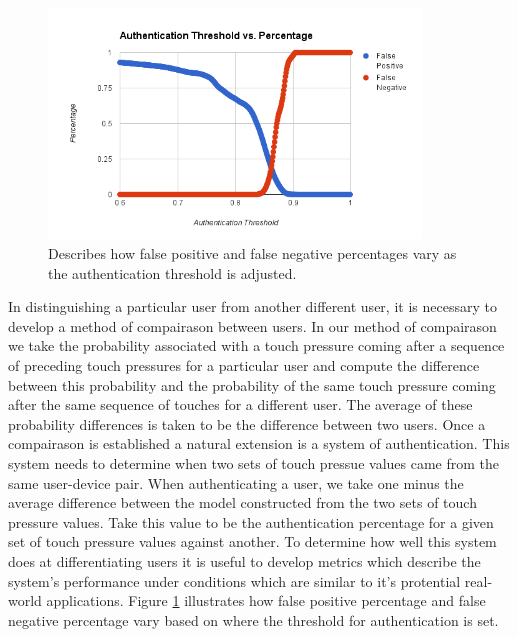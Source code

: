 \documentclass{acm_proc_article-sp}
\begin{document}
\begin{figure}
\centering
\includegraphics[width=3.9in]{threshold_vs_percentages.png}
\caption{Describes how false positive and false negative percentages vary as the authentication threshold is adjusted.}
\label{fig:threshold_vs_percentages}
\end{figure}

In distinguishing a particular user from another different user, it is necessary to develop a method of compairason between users. In our method of compairason we take the probability associated with a touch pressure coming after a sequence of preceding touch pressures for a particular user and compute the difference between this probability and the probability of the same touch pressure coming after the same sequence of touches for a different user. The average of these probability differences is taken to be the difference between two users.
%
Once a compairason is established a natural extension is a system of authentication. This system needs to determine when two sets of touch pressue values came from the same user-device pair. When authenticating a user, we take one minus the average difference between the model constructed from the two sets of touch pressure values. Take this value to be the authentication percentage for a given set of touch pressure values against another.
%
To determine how well this system does at differentiating users it is useful to develop metrics which describe the system's performance under conditions which are similar to it's protential real-world applications. Figure \ref{fig:threshold_vs_percentages} illustrates how false positive percentage and false negative percentage vary based on where the threshold for authentication is set. 
\end{document}
